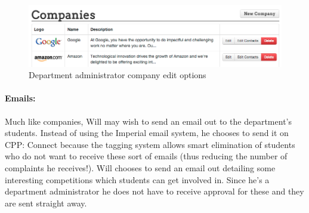     \begin{figure}[H]\centering
    \includegraphics[scale=0.5]{images/user_experiences/admin/admin_company_edit_options}
    \caption{Department administrator company edit options}
    \end{figure}

  \paragraph{Emails:}
    Much like companies, Will may wish to send an email out to the department's students. Instead of using the Imperial email system, he chooses to send it on CPP: Connect because the tagging system allows smart elimination of students who do not want to receive these sort of emails (thus reducing the number of complaints he receives!). Will chooses to send an email out detailing some interesting competitions which students can get involved in. Since he's a department administrator he does not have to receive approval for these and they are sent straight away.
